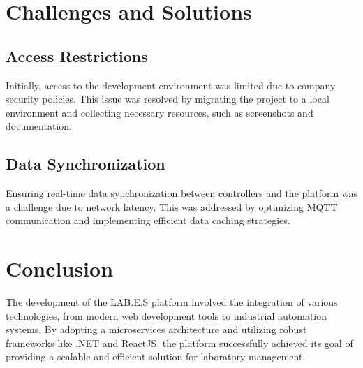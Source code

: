 \section{Challenges and Solutions}

\subsection{Access Restrictions}
Initially, access to the development environment was limited due to company security policies. This issue was resolved by migrating the project to a local environment and collecting necessary resources, such as screenshots and documentation.

\subsection{Data Synchronization}
Ensuring real-time data synchronization between controllers and the platform was a challenge due to network latency. This was addressed by optimizing MQTT communication and implementing efficient data caching strategies.

\section{Conclusion}
The development of the LAB.E.S platform involved the integration of various technologies, from modern web development tools to industrial automation systems. By adopting a microservices architecture and utilizing robust frameworks like .NET and ReactJS, the platform successfully achieved its goal of providing a scalable and efficient solution for laboratory management.

